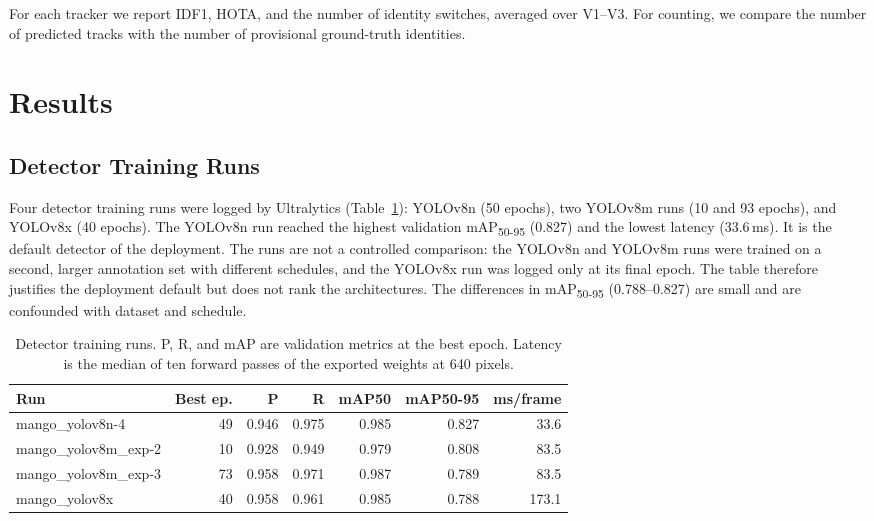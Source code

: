 \documentclass[11pt]{article}
\newif\ifnotes  \notesfalse
\newcommand{\authorcheck}[1]{\ifnotes{\color{red}\textbf{[Author check:} #1\textbf{]}}\fi}
\begin{document}
For each tracker we report IDF1, HOTA, and the number of identity switches, averaged over V1--V3. For counting, we compare the number of predicted tracks with the number of provisional ground-truth identities. \authorcheck{the source labels the count-error column of the tracker table as a percentage but defines it as a mean absolute difference between track and identity counts; its unit is unresolved and is left unlabelled below.}

\section{Results}
\label{sec:results}

\subsection{Detector Training Runs}

Four detector training runs were logged by Ultralytics (Table~\ref{tab:detector}): YOLOv8n (50 epochs), two YOLOv8m runs (10 and 93 epochs), and YOLOv8x (40 epochs). The YOLOv8n run reached the highest validation mAP\textsubscript{50-95} (0.827) and the lowest latency (33.6\,ms). It is the default detector of the deployment. The runs are not a controlled comparison: the YOLOv8n and YOLOv8m runs were trained on a second, larger annotation set with different schedules, and the YOLOv8x run was logged only at its final epoch. The table therefore justifies the deployment default but does not rank the architectures. The differences in mAP\textsubscript{50-95} (0.788--0.827) are small and are confounded with dataset and schedule.

\begin{table}[htbp]
\centering
\small
\caption{Detector training runs. P, R, and mAP are validation metrics at the best epoch. Latency is the median of ten forward passes of the exported weights at 640 pixels.}
\label{tab:detector}
\begin{tabular}{lrrrrrr}
\toprule
\textbf{Run} & \textbf{Best ep.} & \textbf{P} & \textbf{R} & \textbf{mAP50} & \textbf{mAP50-95} & \textbf{ms/frame} \\
\midrule
mango\_yolov8n-4     & 49 & 0.946 & 0.975 & 0.985 & 0.827 & 33.6  \\
mango\_yolov8m\_exp-2 & 10 & 0.928 & 0.949 & 0.979 & 0.808 & 83.5  \\
mango\_yolov8m\_exp-3 & 73 & 0.958 & 0.971 & 0.987 & 0.789 & 83.5  \\
mango\_yolov8x       & 40 & 0.958 & 0.961 & 0.985 & 0.788 & 173.1 \\
\bottomrule
\end{tabular}
\end{table}
\authorcheck{the source prose cites exported weight sizes, but no weight-size column exists in the table, so sizes are omitted here. The device and hardware for the latency column are unclear (the source ties it to the evaluation machine), and 33.6\,ms for the detector alone exceeds the 25.3\,ms per frame reported for detection plus tracking in Table~\ref{tab:runtime}. Reconcile the two.}
\end{document}
